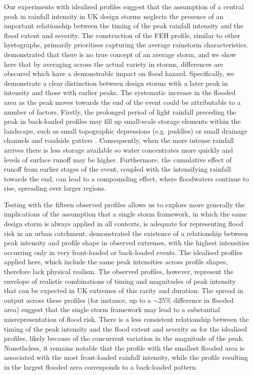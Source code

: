 \documentclass[APA,Times2COL]{WileyNJDv5}
\begin{document}
Our experiments with idealised profiles suggest that the assumption of a central peak in rainfall intensity in UK design storms neglects the presence of an important relationship between the timing of the peak rainfall intensity and the flood extent and severity. The construction of the FEH profile, similar to other hyetographs, primarily prioritises capturing the average rainstorm characteristics. \citet{villalobos2023towards} demonstrated that there is no true concept of an average storm, and we show here that by averaging across the actual variety in storms, differences are obscured which have a demonstrable impact on flood hazard. Specifically, we demonstrate a clear distinction between design storms with a later peak in intensity and those with earlier peaks. The systematic increase in the flooded area as the peak moves towards the end of the event could be attributable to a number of factors. Firstly, the prolonged period of light rainfall preceding the peak in back-loaded profiles may fill up small-scale storage elements within the landscape, such as small topographic depressions (e.g. puddles) or small drainage channels and roadside gutters \citep{bulti2020review}. Consequently, when the more intense rainfall arrives there is less storage available so water concentrates more quickly and levels of surface runoff may be higher. Furthermore, the cumulative effect of runoff from earlier stages of the event, coupled with the intensifying rainfall towards the end, can lead to a compounding effect, where floodwaters continue to rise, spreading over larger regions.

Testing with the fifteen observed profiles allows us to explore more generally the implications of the assumption that a single storm framework, in which the same design storm is always applied in all contexts, is adequate for representing flood risk in an urban catchment. \citet{villalobos2023towards} demonstrated the existence of a relationship between peak intensity and profile shape in observed extremes, with the highest intensities occurring only in very front-loaded or back-loaded events. The idealised profiles applied here, which include the same peak intensities across profile shapes, therefore lack physical realism. The observed profiles, however, represent the envelope of realistic combinations of timing and magnitudes of peak intensity that can be expected in UK extremes of this rarity and duration. The spread in output across these profiles (for instance, up to a $\sim$25\% difference in flooded area) suggest that the single storm framework may lead to a substantial misrepresentation of flood risk. There is a less consistent relationship between the timing of the peak intensity and the flood extent and severity as for the idealised profiles, likely because of the concurrent variation in the magnitude of the peak. Nonetheless, it remains notable that the profile with the smallest flooded area is associated with the most front-loaded rainfall intensity, while the profile resulting in the largest flooded area corresponds to a back-loaded pattern.
\end{document}
